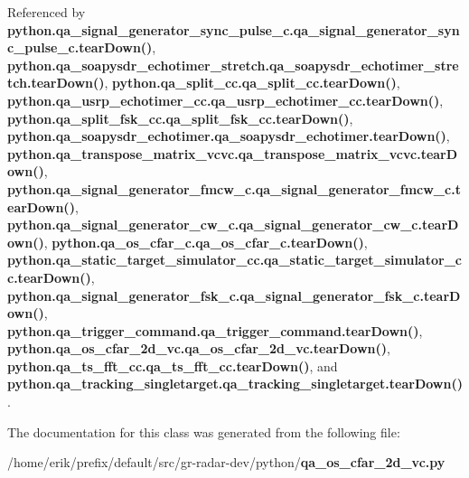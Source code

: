 Referenced by {\bf python.\+qa\+\_\+signal\+\_\+generator\+\_\+sync\+\_\+pulse\+\_\+c.\+qa\+\_\+signal\+\_\+generator\+\_\+sync\+\_\+pulse\+\_\+c.\+tear\+Down()}, {\bf python.\+qa\+\_\+soapysdr\+\_\+echotimer\+\_\+stretch.\+qa\+\_\+soapysdr\+\_\+echotimer\+\_\+stretch.\+tear\+Down()}, {\bf python.\+qa\+\_\+split\+\_\+cc.\+qa\+\_\+split\+\_\+cc.\+tear\+Down()}, {\bf python.\+qa\+\_\+usrp\+\_\+echotimer\+\_\+cc.\+qa\+\_\+usrp\+\_\+echotimer\+\_\+cc.\+tear\+Down()}, {\bf python.\+qa\+\_\+split\+\_\+fsk\+\_\+cc.\+qa\+\_\+split\+\_\+fsk\+\_\+cc.\+tear\+Down()}, {\bf python.\+qa\+\_\+soapysdr\+\_\+echotimer.\+qa\+\_\+soapysdr\+\_\+echotimer.\+tear\+Down()}, {\bf python.\+qa\+\_\+transpose\+\_\+matrix\+\_\+vcvc.\+qa\+\_\+transpose\+\_\+matrix\+\_\+vcvc.\+tear\+Down()}, {\bf python.\+qa\+\_\+signal\+\_\+generator\+\_\+fmcw\+\_\+c.\+qa\+\_\+signal\+\_\+generator\+\_\+fmcw\+\_\+c.\+tear\+Down()}, {\bf python.\+qa\+\_\+signal\+\_\+generator\+\_\+cw\+\_\+c.\+qa\+\_\+signal\+\_\+generator\+\_\+cw\+\_\+c.\+tear\+Down()}, {\bf python.\+qa\+\_\+os\+\_\+cfar\+\_\+c.\+qa\+\_\+os\+\_\+cfar\+\_\+c.\+tear\+Down()}, {\bf python.\+qa\+\_\+static\+\_\+target\+\_\+simulator\+\_\+cc.\+qa\+\_\+static\+\_\+target\+\_\+simulator\+\_\+cc.\+tear\+Down()}, {\bf python.\+qa\+\_\+signal\+\_\+generator\+\_\+fsk\+\_\+c.\+qa\+\_\+signal\+\_\+generator\+\_\+fsk\+\_\+c.\+tear\+Down()}, {\bf python.\+qa\+\_\+trigger\+\_\+command.\+qa\+\_\+trigger\+\_\+command.\+tear\+Down()}, {\bf python.\+qa\+\_\+os\+\_\+cfar\+\_\+2d\+\_\+vc.\+qa\+\_\+os\+\_\+cfar\+\_\+2d\+\_\+vc.\+tear\+Down()}, {\bf python.\+qa\+\_\+ts\+\_\+fft\+\_\+cc.\+qa\+\_\+ts\+\_\+fft\+\_\+cc.\+tear\+Down()}, and {\bf python.\+qa\+\_\+tracking\+\_\+singletarget.\+qa\+\_\+tracking\+\_\+singletarget.\+tear\+Down()}.



The documentation for this class was generated from the following file\+:\begin{DoxyCompactItemize}
\item 
/home/erik/prefix/default/src/gr-\/radar-\/dev/python/{\bf qa\+\_\+os\+\_\+cfar\+\_\+2d\+\_\+vc.\+py}\end{DoxyCompactItemize}
